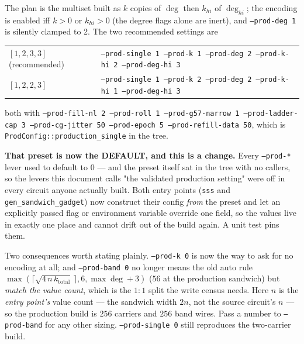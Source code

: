 \documentclass[11pt]{article}
\newcommand{\code}[1]{\texttt{#1}}
\begin{document}
The plan is the multiset built as $k$ copies of $\deg$ then $k_{hi}$ of
$\deg_{hi}$; the encoding is enabled iff $k>0$ or $k_{hi}>0$ (the degree flags
alone are inert), and \code{--prod-deg 1} is silently clamped to 2. The two
recommended settings are

\begin{center}
\begin{tabular}{ll}
\toprule
$[1,2,3,3]$ (recommended) & \code{--prod-single 1 --prod-k 1 --prod-deg 2 --prod-k-hi 2 --prod-deg-hi 3} \\
$[1,2,2,3]$ & \code{--prod-single 1 --prod-k 2 --prod-deg 2 --prod-k-hi 1 --prod-deg-hi 3} \\
\bottomrule
\end{tabular}
\end{center}

both with \code{--prod-fill-nl 2 --prod-roll 1 --prod-g57-narrow 1
--prod-ladder-cap 3 --prod-cg-jitter 50 --prod-epoch 5 --prod-refill-data 50},
which is \code{ProdConfig::production\_single} in the tree.

\textbf{That preset is now the DEFAULT, and this is a change.} Every
\code{--prod-*} lever used to default to $0$ --- and the preset itself sat in
the tree with no callers, so the levers this document calls "the validated
production setting" were off in every circuit anyone actually built. Both entry
points (\code{sss} and \code{gen\_sandwich\_gadget}) now construct their config
\emph{from} the preset and let an explicitly passed flag or environment
variable override one field, so the values live in exactly one place and cannot
drift out of the build again. A unit test pins them.

Two consequences worth stating plainly. \code{--prod-k 0} is now the way to ask
for no encoding at all; and \code{--prod-band 0} no longer means the old auto
rule $\max(\lceil\sqrt{4\,n\,k_{\mathrm{total}}}\,\rceil, 6, \max\deg+3)$
($56$ at the production sandwich) but \emph{match the value count}, which is
the $1{:}1$ split the write census needs. Here $n$ is the \emph{entry point's}
value count --- the sandwich width $2n$, not the source circuit's $n$ --- so the
production build is $256$ carriers and $256$ band wires. Pass a number to
\code{--prod-band} for any other sizing. \code{--prod-single 0} still
reproduces the two-carrier build.
\end{document}
